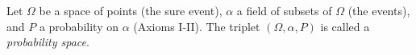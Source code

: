Let $\Omega$ be a space of points (the sure event), $\alpha$ a field of subsets of $\Omega$ (the events), and $P$ a probability on $\alpha$ (Axioms I-II). The triplet $(\Omega, \alpha, P)$ is called a \textit{probability space}.
